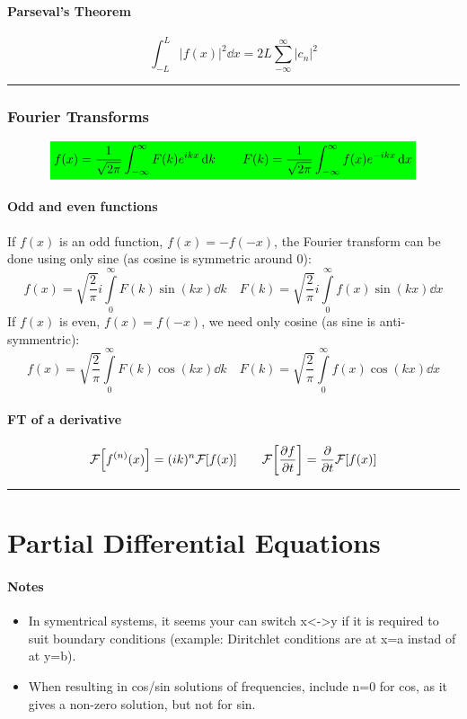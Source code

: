 \documentclass[10pt,a4paper]{article}
\renewcommand{\exp}{e^}
\newcommand{\infint}{\int_{-\infty}^{\infty}}
\newcommand{\holine}[1][\medskipamount]{\par\vspace*{\dimexpr-\parskip-\baselineskip+#1}\noindent\rule{\linewidth}{1pt}\par\vspace*{\dimexpr-\parskip-.5\baselineskip+#1}}
\newcommand{\Holine}[1][\medskipamount]{\par\vspace*{\dimexpr-\parskip-\baselineskip+#1}\noindent\rule{\linewidth}{3pt}\par\vspace*{\dimexpr-\parskip-.5\baselineskip+#1}}
\newcommand{\gr}[1]{\colorbox{green}{$\displaystyle #1$}}
\begin{document}
\begin{multicols}{2}
\subsection*{Parseval's Theorem}
\[
    \int_{-L}^L |f(x)|^2 \dd{x} = 2L\sum_{-\infty}^\infty |c_n|^2
\]



\holine
\section*{Fourier Transforms}
\[\gr{
    f(x) = \frac{1}{\sqrt{2\pi}} \infint F(k) \exp{ikx} \dd{k} \quad\quad
    F(k) = \frac{1}{\sqrt{2\pi}} \infint f(x) \exp{-ikx} \dd{x}
}\]

\subsection*{Odd and even functions}
If $f(x)$ is an odd function, $f(x) = -f(-x)$, the Fourier transform can be done using only sine (as cosine is symmetric around 0):
\[
    f(x) = \sqrt{\frac{2}{\pi}} i\int\limits_0^{\infty} F(k) \sin(k x) \dd{k}   \quad
    F(k) = \sqrt{\frac{2}{\pi}} i\int\limits_0^{\infty} f(x) \sin(k x) \dd{x}
\]
If $f(x)$ is even, $f(x) = f(-x)$, we need only cosine (as sine is anti-symmentric):
\[
    f(x) = \sqrt{\frac{2}{\pi}} \int\limits_0^{\infty} F(k) \cos(k x) \dd{k}   \quad
    F(k) = \sqrt{\frac{2}{\pi}} \int\limits_0^{\infty} f(x) \cos(k x) \dd{x}
\]


\subsection*{FT of a derivative}
\[
    \mathcal{F}\qty[f^{(n)}(x)] = (ik)^n \mathcal{F}\qty[f(x)]
\quad\quad
    \mathcal{F}\qty[\pdv{f}{t}(x)] = \pdv{t}\mathcal{F}\qty[f(x)]
\]

    




\Holine
\part*{Partial Differential Equations}
\subsection*{Notes}
\begin{itemize}
    \item In symentrical systems, it seems your can switch x<->y if it is required to suit boundary conditions (example: Diritchlet conditions are at x=a instad of at y=b).
    \item When resulting in cos/sin solutions of frequencies, include n=0 for cos, as it gives a non-zero solution, but not for sin.
\end{itemize}


\end{multicols}
\end{document}
